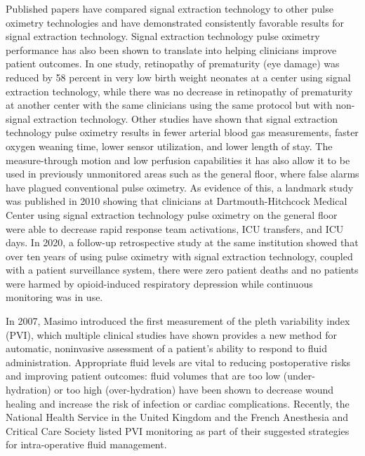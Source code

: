 \documentclass[12pt]{article}
\begin{document}
Published papers have compared signal extraction technology to other pulse oximetry technologies and have demonstrated consistently favorable results for signal extraction technology. Signal extraction technology pulse oximetry performance has also been shown to translate into helping clinicians improve patient outcomes. In one study, retinopathy of prematurity (eye damage) was reduced by 58 percent in very low birth weight neonates at a center using signal extraction technology, while there was no decrease in retinopathy of prematurity at another center with the same clinicians using the same protocol but with non-signal extraction technology. Other studies have shown that signal extraction technology pulse oximetry results in fewer arterial blood gas measurements, faster oxygen weaning time, lower sensor utilization, and lower length of stay. The measure-through motion and low perfusion capabilities it has also allow it to be used in previously unmonitored areas such as the general floor, where false alarms have plagued conventional pulse oximetry. As evidence of this, a landmark study was published in 2010 showing that clinicians at Dartmouth-Hitchcock Medical Center using signal extraction technology pulse oximetry on the general floor were able to decrease rapid response team activations, ICU transfers, and ICU days. In 2020, a follow-up retrospective study at the same institution showed that over ten years of using pulse oximetry with signal extraction technology, coupled with a patient surveillance system, there were zero patient deaths and no patients were harmed by opioid-induced respiratory depression while continuous monitoring was in use.

In 2007, Masimo introduced the first measurement of the pleth variability index (PVI), which multiple clinical studies have shown provides a new method for automatic, noninvasive assessment of a patient's ability to respond to fluid administration. Appropriate fluid levels are vital to reducing postoperative risks and improving patient outcomes: fluid volumes that are too low (under-hydration) or too high (over-hydration) have been shown to decrease wound healing and increase the risk of infection or cardiac complications. Recently, the National Health Service in the United Kingdom and the French Anesthesia and Critical Care Society listed PVI monitoring as part of their suggested strategies for intra-operative fluid management.
\end{document}
